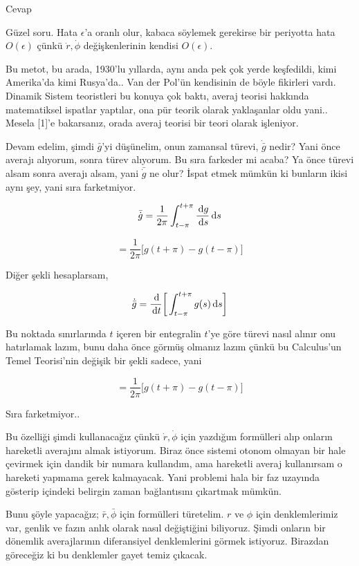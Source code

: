 \documentclass[12pt,fleqn]{article}\usepackage{../../common}
\begin{document}
Cevap

Güzel soru. Hata $\epsilon$'a oranlı olur, kabaca söylemek gerekirse bir
periyotta hata $O(\epsilon)$ çünkü $\dot{r},\dot{\phi}$ değişkenlerinin kendisi
$O(\epsilon)$. 

Bu metot, bu arada, 1930'lu yıllarda, aynı anda pek çok yerde keşfedildi,
kimi Amerika'da kimi Rusya'da.. Van der Pol'ün kendisinin de böyle fikirleri
vardı. Dinamik Sistem teoristleri bu konuya çok baktı, averaj teorisi hakkında
matematiksel ispatlar yaptılar, ona pür teorik olarak yaklaşanlar oldu
yani.. Mesela [1]'e bakarsanız, orada averaj teorisi bir teori olarak
işleniyor. 

Devam edelim, şimdi $\bar{g}$'yi düşünelim, onun zamansal türevi,
$\dot{\bar{g}}$ nedir? Yani önce averajı alıyorum, sonra türev alıyorum. Bu sıra
farkeder mi acaba? Ya önce türevi alsam sonra averajı alsam, yani
$\bar{\dot{g}}$ ne olur? İspat etmek mümkün ki bunların ikisi aynı şey, yani
sıra farketmiyor. 

$$ \bar{\dot{g}} =
\frac{1}{2\pi} \int_{t-\pi}^{t+\pi} \frac{\,\mathrm{d} g}{\,\mathrm{d} s} \,\mathrm{d} s
$$


$$
= \frac{1}{2\pi} \bigg[ g(t+\pi) -   g(t-\pi) \bigg]
$$

Diğer şekli hesaplarsam,

$$ \dot{\bar{g}} =
\frac{\,\mathrm{d}}{\,\mathrm{d} t} \bigg[ \int_{t-\pi}^{t+\pi} g(s) \,\mathrm{d} s \bigg]
$$

Bu noktada sınırlarında $t$ içeren bir entegralin $t$'ye göre türevi nasıl
alınır onu hatırlamak lazım, bunu daha önce görmüş olmanız lazım çünkü bu
Calculus'un Temel Teorisi'nin değişik bir şekli sadece, yani

$$
= \frac{1}{2\pi} \bigg[ g(t+\pi) -   g(t-\pi) \bigg]
$$

Sıra farketmiyor..

Bu özelliği şimdi kullanacağız çünkü $\dot{r},\dot{\phi}$ için yazdığım
formülleri alıp onların hareketli averajını almak istiyorum. Biraz önce sistemi
otonom olmayan bir hale çevirmek için dandik bir numara kullandım, ama hareketli
averaj kullanırsam o hareketi yapmama gerek kalmayacak. Yani problemi hala bir
faz uzayında gösterip içindeki belirgin zaman bağlantısını çıkartmak
mümkün.

Bunu şöyle yapacağız; $\bar{r},\bar{\phi}$ için formülleri türetelim. $r$ ve
$\phi$ için denklemlerimiz var, genlik ve fazın anlık olarak nasıl değiştiğini
biliyoruz. Şimdi onların bir dönemlik averajlarının diferansiyel denklemlerini
görmek istiyoruz. Birazdan göreceğiz ki bu denklemler gayet temiz çıkacak.
\end{document}
